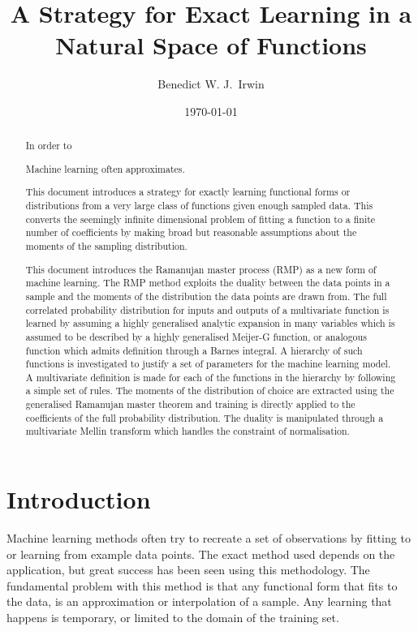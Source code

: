 \documentclass[journal=jcisd8,manuscript=article,layout=onecolumn,pdftex,floatfix,amsmath,amssymb,10pt]{achemso}
\title{A Strategy for Exact Learning in a Natural Space of Functions}
\author{Benedict W. J.~Irwin}
\affiliation{Optibrium, F5-6 Blenheim House, Cambridge Innovation Park,
Denny End Road, Cambridge, CB25 9PB, United Kingdom}
\date{\today}
\begin{document}
\begin{abstract}
In order to 



Machine learning often approximates.

This document introduces a strategy for exactly learning functional forms or distributions from a very large class of functions given enough sampled data. This converts the seemingly infinite dimensional problem of fitting a function to a finite number of coefficients by making broad but reasonable assumptions about the moments of the sampling distribution. 




This document introduces the Ramanujan master process (RMP) as a new form of machine learning. The RMP method exploits the duality between the data points in a sample and the moments of the distribution the data points are drawn from. The full correlated probability distribution for inputs and outputs of a multivariate function is learned by assuming a highly generalised analytic expansion in many variables which is assumed to be described by a highly generalised Meijer-G function, or analogous function which admits definition through a Barnes integral. A hierarchy of such functions is investigated to justify a set of parameters for the machine learning model. A multivariate definition is made for each of the functions in the hierarchy by following a simple set of rules. The moments of the distribution of choice are extracted using the generalised Ramanujan master theorem and training is directly applied to the coefficients of the full probability distribution. The duality is manipulated through a multivariate Mellin transform which handles the constraint of normalisation.
\end{abstract}

\tableofcontents


\section{Introduction}
Machine learning methods often try to recreate a set of observations by fitting to or learning from example data points. The exact method used depends on the application, but great success has been seen using this methodology. The fundamental problem with this method is that any functional form that fits to the data, is an approximation or interpolation of a sample. Any learning that happens is temporary, or limited to the domain of the training set. 
\end{document}
